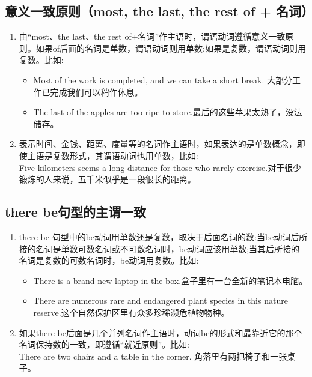 \subsection{意义一致原则（most, the last, the rest of + 名词）}

\begin{enumerate}
  \item 由“most、the last、the rest of+名词”作主语时，谓语动词遵循意义一致原则。如果of后面的名词是单数，谓语动词则用单数;如果是复数，谓语动词则用复数。比如:
        \begin{itemize}
          \item Most of the work is completed, and we can take a short break. 大部分工作已完成我们可以稍作休息。
          \item The last of the apples are too ripe to store.最后的这些苹果太熟了，没法储存。
        \end{itemize}
  \item 表示时间、金钱、距离、度量等的名词作主语时，如果表达的是单数概念，即使主语是复数形式，其谓语动词也用单数，比如:\\
        Five kilometers seems a long distance for those who rarely exercise.对于很少锻炼的人来说，五千米似乎是一段很长的距离。
\end{enumerate}

\subsection{there be句型的主谓一致}

\begin{enumerate}
  \item there be 句型中的be动词用单数还是复数，取决于后面名词的数:当be动词后所接的名词是单数可数名词或不可数名词时，be动词应该用单数;当其后所接的名词是复数的可数名词时，be动词用复数。比如:
        \begin{itemize}
          \item There is a brand-new laptop in the box.盒子里有一台全新的笔记本电脑。
          \item There are numerous rare and endangered plant species in this nature reserve.这个自然保护区里有众多珍稀濒危植物物种。
        \end{itemize}
  \item 如果there be后面是几个并列名词作主语时，动词be的形式和最靠近它的那个名词保持数的一致，即遵循“就近原则”。比如:\\
        There are two chairs and a table in the corner. 角落里有两把椅子和一张桌子。
\end{enumerate}




